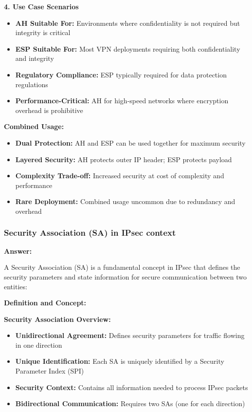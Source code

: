 \documentclass[12pt,a4paper]{article}
\begin{document}
\textbf{4. Use Case Scenarios}
\begin{itemize}
    \item \textbf{AH Suitable For:} Environments where confidentiality is not required but integrity is critical
    \item \textbf{ESP Suitable For:} Most VPN deployments requiring both confidentiality and integrity
    \item \textbf{Regulatory Compliance:} ESP typically required for data protection regulations
    \item \textbf{Performance-Critical:} AH for high-speed networks where encryption overhead is prohibitive
\end{itemize}

\textbf{Combined Usage:}
\begin{itemize}
    \item \textbf{Dual Protection:} AH and ESP can be used together for maximum security
    \item \textbf{Layered Security:} AH protects outer IP header; ESP protects payload
    \item \textbf{Complexity Trade-off:} Increased security at cost of complexity and performance
    \item \textbf{Rare Deployment:} Combined usage uncommon due to redundancy and overhead
\end{itemize}

\subsubsection{Security Association (SA) in IPsec context}

\textbf{Answer:}

A Security Association (SA) is a fundamental concept in IPsec that defines the security parameters and state information for secure communication between two entities:

\textbf{Definition and Concept:}

\textbf{Security Association Overview:}
\begin{itemize}
    \item \textbf{Unidirectional Agreement:} Defines security parameters for traffic flowing in one direction
    \item \textbf{Unique Identification:} Each SA is uniquely identified by a Security Parameter Index (SPI)
    \item \textbf{Security Context:} Contains all information needed to process IPsec packets
    \item \textbf{Bidirectional Communication:} Requires two SAs (one for each direction)
\end{itemize}
\end{document}
